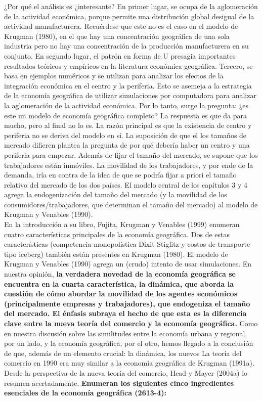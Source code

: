¿Por qué el análisis es ¿interesante? En primer lugar, se ocupa de la aglomeración de la actividad económica, porque permite una distribución global desigual de la actividad manufacturera. Recuérdese que este no es el caso en el modelo de Krugman (1980), en el que hay una concentración geográfica de una sola industria pero no hay una concentración de la producción manufacturera en su conjunto. En segundo lugar, el patrón en forma de U  presagia importantes resultados teóricos y empíricos en la literatura económica geográfica. Tercero,  se basa en ejemplos numéricos y se utilizan para analizar los efectos de la integración económica en el centro y la periferia. Esto se asemeja a la estrategia de la economía geográfica de utilizar simulaciones por computadora para analizar la aglomeración de la actividad económica. Por lo tanto, surge la pregunta: ¿es este un modelo de economía geográfica completo? La respuesta es que da para mucho, pero al final no lo es. La razón principal es que la existencia de centro y periferia no se deriva del modelo en sí. La suposición de que el los tamaños de mercado difieren plantea la pregunta de por qué debería haber un centro y una periferia para empezar. Además de fijar el tamaño del mercado, se supone que los trabajadores están inmóviles. La movilidad de los trabajadores, y por ende de la demanda, iría en contra de la idea de que se podría fijar a priori el tamaño relativo del mercado de los dos países. El modelo central de los capítulos 3 y 4 agrega la endogenización del tamaño del mercado (y la movilidad de los consumidores/trabajadores, que determinan el tamaño del mercado) al modelo de Krugman y Venables (1990).\\
En la introducción a su libro, Fujita, Krugman y Venables (1999) enumeran cuatro características principales de la economía geográfica. Dos de estas características (competencia monopolística Dixit-Stiglitz y costos de transporte tipo iceberg) también están presentes en Krugman (1980). El modelo de Krugman y Venables (1990) agrega un (crudo) intento de usar simulaciones. En nuestra opinión, \textbf{la verdadera novedad de la economía geográfica se encuentra en la cuarta característica, la dinámica, que aborda la cuestión de cómo abordar la movilidad de los agentes económicos (principalmente empresas y trabajadores), que endogeniza el tamaño del mercado. El énfasis subraya el hecho de que esta es la diferencia clave entre la nueva teoría del comercio y la economía geográfica.} Como en nuestra discusión  sobre las similitudes entre la economía urbana y regional, por un lado, y la economía geográfica, por el otro, hemos llegado a la conclusión de que, además de un elemento crucial: la dinámica, los nuevos La teoría del comercio en 1990 era muy similar a la economía geográfica de Krugman (1991a). Desde la perspectiva de la nueva teoría del comercio, Head y Mayer (2004a) lo resumen acertadamente. \textbf{Enumeran los siguientes cinco ingredientes esenciales de la economía geográfica (2613-4):}
